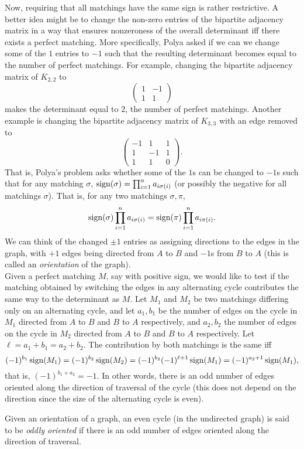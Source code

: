 Now, requiring that all matchings have the same sign is rather restrictive. A better idea might be to change the non-zero entries of the bipartite adjacency matrix in a way that ensures nonzeroness of the overall determinant iff there exists a perfect matching. More specifically, Polya asked if we can we change some of the $1$ entries to $-1$ such that the resulting determinant becomes equal to the number of perfect matchings. For example, changing the bipartite adjacency matrix of $K_{2,2}$ to
\[ \begin{pmatrix} 1 & -1 \\ 1 & 1 \end{pmatrix} \]
makes the determinant equal to $2$, the number of perfect matchings. Another example is changing the bipartite adjacency matrix of $K_{3,3}$ with an edge removed to
\[ \begin{pmatrix} -1 & 1 & 1 \\ 1 & -1 & 1 \\ 1 & 1 & 0 \end{pmatrix}. \]
That is, Polya's problem asks whether some of the $1$s can be changed to $-1$s such that for any matching $\sigma$, $\operatorname{sign}(\sigma) = \prod_{i=1}^{n} a_{i\sigma(i)}$ (or possibly the negative for all matchings $\sigma$). That is, for any two matchings $\sigma,\pi$,
\[ \operatorname{sign}(\sigma) \prod_{i=1}^n a_{i \sigma(i)} = \operatorname{sign}(\pi) \prod_{i=1}^n a_{i \pi(i)}. \]
We can think of the changed $\pm 1$ entries as assigning directions to the edges in the graph, with $+1$ edges being directed from $A$ to $B$ and $-1$s from $B$ to $A$ (this is called an \emph{orientation} of the graph). \\
Given a perfect matching $M$, say with positive sign, we would like to test if the matching obtained by switching the edges in any alternating cycle contributes the same way to the determinant as $M$. Let $M_1$ and $M_2$ be two matchings differing only on an alternating cycle, and let $a_1,b_1$ be the number of edges on the cycle in $M_1$ directed from $A$ to $B$ and $B$ to $A$ respectively, and $a_2,b_2$ the number of edges on the cycle in $M_2$ directed from $A$ to $B$ and $B$ to $A$ respectively. Let $\ell = a_1+b_1 = a_2+b_2$. The contribution by both matchings is the same iff
\[ (-1)^{b_1} \operatorname{sign}(M_1) = (-1)^{b_2} \operatorname{sign}(M_2) = (-1)^{b_2} (-1)^{\ell+1} \operatorname{sign}(M_1) = (-1)^{a_2+1} \operatorname{sign}(M_1), \]
that is, $(-1)^{b_1+a_2} = -1$. In other words, there is an odd number of edges oriented along the direction of traversal of the cycle (this does not depend on the direction since the size of the alternating cycle is even).
\begin{fdef}
	Given an orientation of a graph, an even cycle (in the undirected graph) is said to be \emph{oddly oriented} if there is an odd number of edges oriented along the direction of traversal.
\end{fdef}

